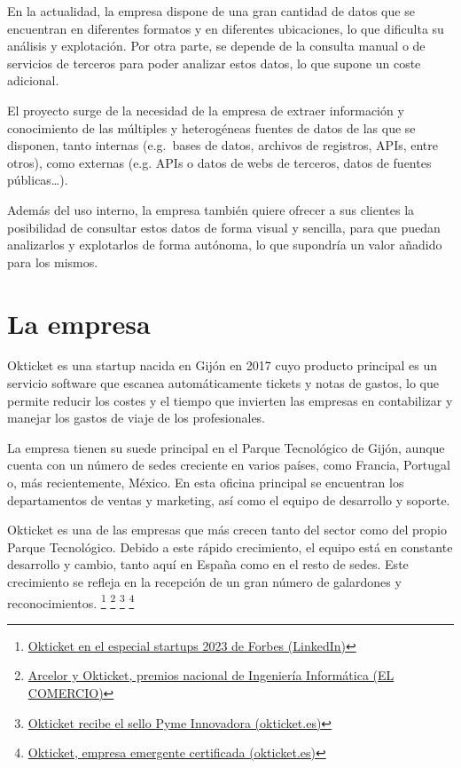 En la actualidad, la empresa dispone de una gran cantidad de datos que se encuentran en
diferentes formatos y en diferentes ubicaciones, lo que dificulta su análisis y explotación.
Por otra parte, se depende de la consulta manual o de servicios de terceros para poder analizar
estos datos, lo que supone un coste adicional.

El proyecto surge de la necesidad de la empresa de extraer información y conocimiento de las
múltiples y heterogéneas fuentes de datos de las que se disponen, tanto internas (e.g.~bases de
datos, archivos de registros, APIs, entre otros), como externas (e.g. APIs o datos de webs de
terceros, datos de fuentes públicas\ldots).

Además del uso interno, la empresa también quiere ofrecer a sus clientes la posibilidad de
consultar estos datos de forma visual y sencilla, para que puedan analizarlos y explotarlos de
forma autónoma, lo que supondría un valor añadido para los mismos.

\newpage{}
\section{La empresa}\label{sec:empresa}
Okticket es una startup nacida en Gijón en 2017 cuyo producto principal es un servicio software que escanea
automáticamente tickets y notas de gastos, lo que permite reducir los costes y el tiempo que invierten
las empresas en contabilizar y manejar los gastos de viaje de los profesionales.

La empresa tienen su suede principal en el Parque Tecnológico de Gijón, aunque cuenta con un número
de sedes creciente en varios países, como Francia, Portugal o, más recientemente, México. En esta
oficina principal se encuentran los departamentos de ventas y marketing, así como el equipo de
desarrollo y soporte.

Okticket es una de las empresas que más crecen tanto del sector como del propio Parque
Tecnológico. Debido a este rápido crecimiento, el equipo está en constante desarrollo y
cambio, tanto aquí en España como en el resto de sedes. Este crecimiento se refleja
en la recepción de un gran número de galardones y reconocimientos.
\footnote{\href{https://www.linkedin.com/posts/okticket_okticket-en-el-especial-startups-de-forbes-activity-7140622980618903552-UGWK}{Okticket en el especial startups 2023 de Forbes (LinkedIn)}}
\footnote{\href{https://www.elcomercio.es/economia/arcelor-okticket-premios-20230222002438-ntvo.html}{Arcelor y Okticket, premios nacional de Ingeniería Informática (EL COMERCIO)}}
\footnote{\href{https://www.okticket.es/blog/empresa-pyme-innovadora}{Okticket recibe el sello Pyme Innovadora (okticket.es)}}
\footnote{\href{https://www.okticket.es/blog/okticket-empresa-emergente-certificada}{Okticket, empresa emergente certificada (okticket.es)}}

